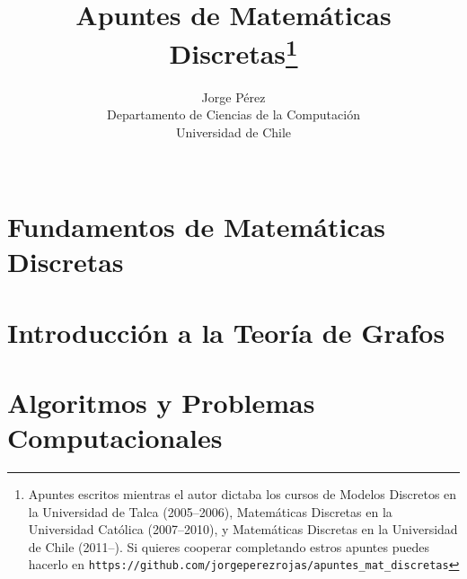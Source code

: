 \documentclass[letter]{report}
\begin{document}
\title{\Huge\bf Apuntes de Matem\'aticas Discretas\footnote{Apuntes escritos mientras el autor dictaba los cursos de Modelos Discretos en la Universidad de Talca (2005--2006), Matemáticas Discretas en la Universidad Católica (2007--2010), y Matemáticas Discretas en la Universidad de Chile (2011--).
Si quieres cooperar completando estros apuntes puedes hacerlo en \texttt{https://github.com/jorgeperezrojas/apuntes\_mat\_discretas}}}
\author{\LARGE Jorge P\'erez \vspace*{1em} \\ Departamento de Ciencias de la Computaci\'on  \\ Universidad de Chile \\
\vspace*{15em} \\ %
}
\maketitle

\pagestyle{empty}
\thispagestyle{empty}
\tableofcontents
\chapter{Fundamentos de Matemáticas Discretas}
\setcounter{chapter}{1}
\thispagestyle{empty}

\newpage


\newpage


\newpage


\newpage


\newpage


\newpage



\newpage


\newpage
\thispagestyle{empty}
\setcounter{chapter}{1}
\chapter{Introducción a la Teoría de Grafos}
\thispagestyle{empty}

\newpage




\newpage


\newpage



\setcounter{chapter}{2}
\newpage
\thispagestyle{empty}
\chapter{Algoritmos y Problemas Computacionales}
\thispagestyle{empty}

\newpage


\newpage

\end{document}
